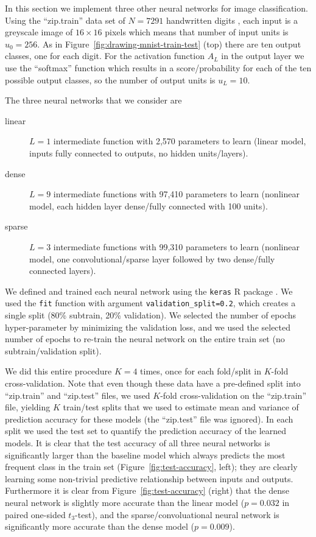 \documentclass[12pt]{article}
\begin{document}
In this section we implement three other neural networks for image
classification. Using the ``zip.train'' data set of $N=7291$
handwritten digits \citep{Hastie2009}, each input is a greyscale image
of $16\times 16$ pixels which means that number of input units is
$u_0=256$. As in Figure~\ref{fig:drawing-mnist-train-test} (top) there
are ten output classes, one for each digit. For the activation
function $A_L$ in the output layer we use the ``softmax'' function
which results in a score/probability for each of the ten possible
output classes, so the number of output units is $u_L=10$.

The three neural networks that we consider are
\begin{description}
\item[linear] $L=1$ intermediate function with 2,570 parameters to
  learn (linear model, inputs fully connected to outputs, no hidden
  units/layers).
\item[dense] $L=9$ intermediate functions with 97,410 parameters to
  learn (nonlinear model, each hidden layer dense/fully connected with
  100 units).
\item[sparse] $L=3$ intermediate functions with 99,310 parameters to
  learn (nonlinear model, one convolutional/sparse layer followed
  by two dense/fully connected layers).
\end{description}
We defined and trained each neural network using the \texttt{keras} R
package \citep{Allaire2020}. We used the \texttt{fit} function with
argument \verb|validation_split=0.2|, which creates a single split
(80\% subtrain, 20\% validation). We selected the number of epochs
hyper-parameter by minimizing the validation loss, and we used the
selected number of epochs to re-train the neural network on the entire
train set (no subtrain/validation split).

We did this entire procedure $K=4$ times, once for each fold/split in
$K$-fold cross-validation. Note that even though these data have a
pre-defined split into ``zip.train'' and ``zip.test'' files, we used
$K$-fold cross-validation on the ``zip.train'' file, yielding $K$
train/test splits that we used to estimate mean and variance of
prediction accuracy for these models (the ``zip.test'' file was
ignored). In each split we used the test set to quantify the
prediction accuracy of the learned models. It is clear that the test
accuracy of all three neural networks is significantly larger than the
baseline model which always predicts the most frequent class in the
train set (Figure~\ref{fig:test-accuracy}, left); they are clearly
learning some non-trivial predictive relationship between inputs and
outputs. Furthermore it is clear from Figure~\ref{fig:test-accuracy}
(right) that the dense neural network is slightly more accurate than
the linear model ($p=0.032$ in paired one-sided $t_3$-test), and the
sparse/convoluational neural network is significantly more accurate
than the dense model ($p=0.009$).
\end{document}
